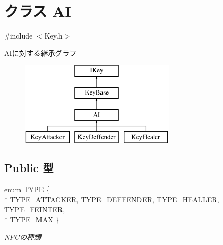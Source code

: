 \hypertarget{class_a_i}{\section{クラス A\-I}
\label{class_a_i}
}


{\ttfamily \#include $<$Key.\-h$>$}

A\-Iに対する継承グラフ\begin{figure}[H]
\begin{center}
\leavevmode
\includegraphics[height=4.000000cm]{d9/d64/class_a_i}
\end{center}
\end{figure}
\subsection*{Public 型}
\begin{DoxyCompactItemize}
\item 
enum \hyperlink{class_a_i_ac649e1da72d905f0b48e92c8aeb29bca}{T\-Y\-P\-E} \{ \\*
\hyperlink{class_a_i_ac649e1da72d905f0b48e92c8aeb29bcaa76b6461a36be98b9e9fb44f03dad5e5e}{T\-Y\-P\-E\-\_\-\-A\-T\-T\-A\-C\-K\-E\-R}, 
\hyperlink{class_a_i_ac649e1da72d905f0b48e92c8aeb29bcaa87446a443c551078bdeae8c84065e259}{T\-Y\-P\-E\-\_\-\-D\-E\-F\-F\-E\-N\-D\-E\-R}, 
\hyperlink{class_a_i_ac649e1da72d905f0b48e92c8aeb29bcaaaf5cee11cc14232d7691a1b11b14109a}{T\-Y\-P\-E\-\_\-\-H\-E\-A\-L\-L\-E\-R}, 
\hyperlink{class_a_i_ac649e1da72d905f0b48e92c8aeb29bcaa414de6573cb966cd1833418456b99a02}{T\-Y\-P\-E\-\_\-\-F\-E\-I\-N\-T\-E\-R}, 
\\*
\hyperlink{class_a_i_ac649e1da72d905f0b48e92c8aeb29bcaaf496cd875c5a21038d274b1943700e0d}{T\-Y\-P\-E\-\_\-\-M\-A\-X}
 \}
\begin{DoxyCompactList}\small\item\em N\-P\-Cの種類 \end{DoxyCompactList}\end{DoxyCompactItemize}

